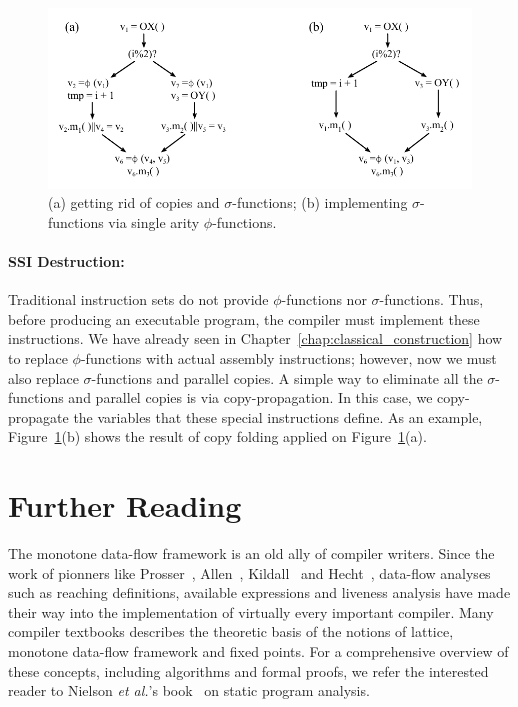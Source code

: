 \begin{figure}[t!]
\centering
\includegraphics[width=\textwidth]{sigImpl}
\caption{(a) getting rid of copies and $\sigma$-functions; (b) implementing $\sigma$-functions via single arity $\phi$-functions.}
\label{fig:sigImpl}
\end{figure}

\paragraph{SSI Destruction: }
Traditional instruction sets do not provide $\phi$-functions nor $\sigma$-functions.
Thus, before producing an executable program, the compiler must implement these instructions.
We have already seen in Chapter~\ref{chap:classical_construction} how to replace $\phi$-functions with actual assembly instructions; however, now we must also replace $\sigma$-functions and parallel copies.
A simple way to eliminate all the $\sigma$-functions and parallel copies is via copy-propagation.
In this case, we copy-propagate the variables that these special instructions define.
As an example, Figure~\ref{fig:sigImpl}(b) shows the result of copy folding applied on Figure~\ref{fig:sigImpl}(a).

\section{Further Reading}

The monotone data-flow framework is an old ally of compiler writers.
Since the work of pionners like Prosser~\cite{Prosser59}, Allen~\cite{Allen70,Allen76}, Kildall~\cite{Kildall77} and Hecht~\cite{Hecht77}, data-flow analyses such as reaching definitions, available expressions and liveness analysis have made their way into the implementation of virtually every important compiler.
Many compiler textbooks describes the theoretic basis of the notions of lattice, monotone data-flow framework and fixed points.
For a comprehensive overview of these concepts, including algorithms and formal proofs, we refer the interested reader to Nielson {\em et al.}'s book~\cite{Nielson05} on static program analysis.


